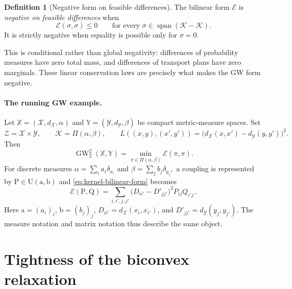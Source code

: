 \documentclass[11pt]{article}
\theoremstyle{definition}
\newtheorem{definition}[theorem]{Definition}
\theoremstyle{remark}
\newcommand{\Kcal}{\mathcal K}
\newcommand{\Umat}{\mathrm U}
\newcommand{\Pmat}{\mathrm P}
\newcommand{\Qmat}{\mathrm Q}
\newcommand{\Ee}{\mathcal E}
\newcommand{\Span}{\operatorname{span}}
\begin{document}
\begin{definition}[Negative form on feasible differences]
\label{def:negative-form}
The bilinear form \(\Ee\) is \emph{negative on feasible differences} when
\begin{equation}\label{eq:negative-feasible-differences}
  \Ee(\sigma,\sigma)\leq0
  \qquad
  \text{for every }\sigma\in\Span(\Kcal-\Kcal).
\end{equation}
It is strictly negative when equality is possible only for \(\sigma=0\).
\end{definition}

This is conditional rather than global negativity: differences of
probability measures have zero total mass, and differences of transport plans
have zero marginals.  These linear conservation laws are precisely what makes
the GW form negative.

\paragraph{The running GW example.}
Let
\(
 \mathbb X=(\mathcal X,d_{\mathcal X},\alpha)
\)
and
\(
 \mathbb Y=(\mathcal Y,d_{\mathcal Y},\beta)
\)
be compact metric-measure spaces.  Set
\begin{equation}\label{eq:gw-measure-specialization}
  \mathcal Z=\mathcal X\times\mathcal Y,
  \qquad
  \Kcal=\Pi(\alpha,\beta),
  \qquad
  L((x,y),(x',y'))
  =\bigl(d_{\mathcal X}(x,x')-d_{\mathcal Y}(y,y')\bigr)^2.
\end{equation}
Then
\begin{equation}\label{eq:continuous-gw-energy}
  \operatorname{GW}_2^2(\mathbb X,\mathbb Y)
  =\min_{\pi\in\Pi(\alpha,\beta)}\Ee(\pi,\pi).
\end{equation}
For discrete measures
\(
 \alpha=\sum_i a_i\delta_{x_i}
\)
and
\(
 \beta=\sum_j b_j\delta_{y_j},
\)
a coupling is represented by
\(
 \Pmat\in\Umat(\mathrm a,\mathrm b)
\)
and \eqref{eq:kernel-bilinear-form} becomes
\begin{equation}\label{eq:discrete-polarized-gw}
  \Ee(\Pmat,\Qmat)
  =
  \sum_{i,i',j,j'}
  \bigl(D_{ii'}-D'_{jj'}\bigr)^2P_{ij}Q_{i'j'}.
\end{equation}
Here \(\mathrm a=(a_i)_i\), \(\mathrm b=(b_j)_j\),
\(D_{ii'}=d_{\mathcal X}(x_i,x_{i'})\), and
\(D'_{jj'}=d_{\mathcal Y}(y_j,y_{j'})\).  The measure notation and matrix
notation thus describe the same object.

\section{Tightness of the biconvex relaxation}
\label{sec:tightness}
\end{document}
